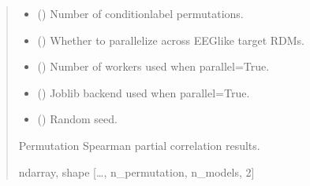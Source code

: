 \documentclass[letterpaper,10pt,english]{sphinxhowto}
\begin{document}
\begin{fulllineitems}
\begin{quote}
\begin{description}
\begin{itemize}
\item {} 
\sphinxAtStartPar
{} (\sphinxstyleliteralemphasis{\sphinxupquote{, }}) \textendash{} Number of condition\sphinxhyphen{}label permutations.

\item {} 
\sphinxAtStartPar
{} (\sphinxstyleliteralemphasis{\sphinxupquote{, }}) \textendash{} Whether to parallelize across EEG\sphinxhyphen{}like target RDMs.

\item {} 
\sphinxAtStartPar
{} (\sphinxstyleliteralemphasis{\sphinxupquote{, }}) \textendash{} Number of workers used when parallel=True.

\item {} 
\sphinxAtStartPar
{} (\sphinxstyleliteralemphasis{\sphinxupquote{, }}\sphinxstyleliteralemphasis{\sphinxupquote{, }}) \textendash{} Joblib backend used when parallel=True.

\item {} 
\sphinxAtStartPar
{} (\sphinxstyleliteralemphasis{\sphinxupquote{, }}) \textendash{} Random seed.

\end{itemize}

\sphinxAtStartPar
{} \textendash{} Permutation Spearman partial correlation results.

\sphinxAtStartPar
ndarray, shape {[}…, n\_permutation, n\_models, 2{]}

\end{description}\end{quote}

\end{fulllineitems}
\end{document}
